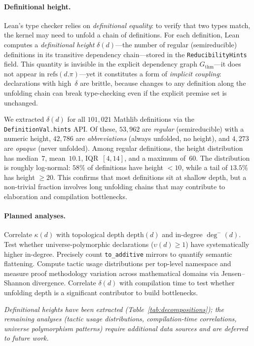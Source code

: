 \paragraph{Definitional height.}
Lean's type checker relies on \emph{definitional equality}: to verify that two types match, the kernel may need to unfold a chain of definitions. For each definition, Lean computes a \emph{definitional height} $\delta(d)$---the number of regular (semireducible) definitions in its transitive dependency chain---stored in the \texttt{ReducibilityHints} field. This quantity is invisible in the explicit dependency graph $G_{\mathrm{thm}}$---it does not appear in $\mathrm{refs}(d.\pi)$---yet it constitutes a form of \emph{implicit coupling}: declarations with high~$\delta$ are brittle, because changes to any definition along the unfolding chain can break type-checking even if the explicit premise set is unchanged.

We extracted $\delta(d)$ for all $101{,}021$ Mathlib definitions via the \texttt{DefinitionVal.hints} API. Of these, $53{,}962$ are \emph{regular} (semireducible) with a numeric height, $42{,}786$ are \emph{abbreviations} (always unfolded, no height), and $4{,}273$ are \emph{opaque} (never unfolded). Among regular definitions, the height distribution has median~$7$, mean~$10.1$, IQR~$[4, 14]$, and a maximum of~$60$. The distribution is roughly log-normal: $58\%$ of definitions have height $< 10$, while a tail of $13.5\%$ has height $\ge 20$. This confirms that most definitions sit at shallow depth, but a non-trivial fraction involves long unfolding chains that may contribute to elaboration and compilation bottlenecks.

\paragraph{Planned analyses.}
Correlate $\kappa(d)$ with topological depth $\mathrm{depth}(d)$ and in-degree $\deg^{-}(d)$. Test whether universe-polymorphic declarations ($\upsilon(d) \ge 1$) have systematically higher in-degree. Precisely count \texttt{to\_additive} mirrors to quantify semantic flattening. Compute tactic usage distributions per top-level namespace and measure proof methodology variation across mathematical domains via Jensen--Shannon divergence. Correlate $\delta(d)$ with compilation time to test whether unfolding depth is a significant contributor to build bottlenecks.

\emph{Definitional heights have been extracted (Table~\ref{tab:decompositions}); the remaining analyses (tactic usage distributions, compilation-time correlations, universe polymorphism patterns) require additional data sources and are deferred to future work.}

